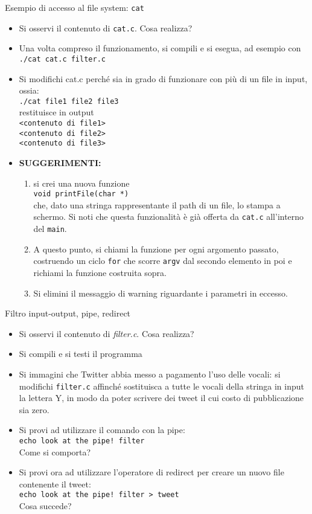 \documentclass{beamer}
\begin{document}
\begin{frame}[fragile]{Esempio di accesso al file system: \texttt{cat}}
\begin{itemize}
 \item Si osservi il contenuto di \texttt{cat.c}. Cosa realizza?
 \item Una volta compreso il funzionamento, si compili e si esegua, ad esempio con \\ \texttt{./cat cat.c filter.c}
 \item Si modifichi cat.c perché sia in grado di funzionare con più di un file in input, ossia: \\ \texttt{./cat file1 file2 file3} \\ restituisce in output \\ \texttt{<contenuto di file1> \\ <contenuto di file2> \\ <contenuto di file3>}
 \item \textbf{SUGGERIMENTI:}
 \begin{enumerate}
 \scriptsize
  \item si crei una nuova funzione \\ \texttt{void printFile(char *)} \\ che, dato una stringa rappresentante il path di un file, lo stampa a schermo. Si noti che questa funzionalità è già offerta da \texttt{cat.c} all'interno del \texttt{main}.
 \scriptsize
  \item A questo punto, si chiami la funzione per ogni argomento passato, costruendo un ciclo \texttt{for} che scorre \texttt{argv} dal secondo elemento in poi e richiami la funzione costruita sopra.
 \scriptsize
  \item Si elimini il messaggio di warning riguardante i parametri in eccesso.
 \end{enumerate}
\end{itemize}
\end{frame}

\begin{frame}[fragile]{Filtro input-output, pipe, redirect}
\begin{itemize}
 \item Si osservi il contenuto di \emph{filter.c}. Cosa realizza?
 \item Si compili e si testi il programma
 \item Si immagini che Twitter abbia messo a pagamento l'uso delle vocali: si modifichi \texttt{filter.c} affinché sostituisca a tutte le vocali della stringa in input la lettera Y, in modo da poter scrivere dei tweet il cui costo di pubblicazione sia zero.
 \item Si provi ad utilizzare il comando con la pipe: \\ \texttt{echo look at the pipe! \textbar{} filter} \\ Come si comporta?
 \item Si provi ora ad utilizzare l'operatore di redirect per creare un nuovo file contenente il tweet: \\ \texttt{echo look at the pipe! \textbar{} filter > tweet} \\ Cosa succede?
\end{itemize}
\end{frame}
\end{document}
